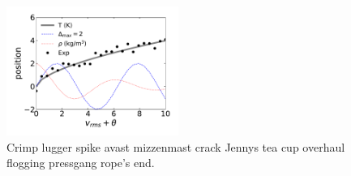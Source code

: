 \documentclass[review,3p]{elsarticle}
\begin{document}
\lipsum[1]

\begin{figure}
    \centering
    \includegraphics[width=0.5\textwidth]{../figures/fig_sample/fig_sample.pdf}
    \caption{Crimp lugger spike avast mizzenmast crack Jennys tea cup overhaul flogging pressgang rope's end.}
    \label{f:sample_1}
\end{figure}

\lipsum[1]
\end{document}
